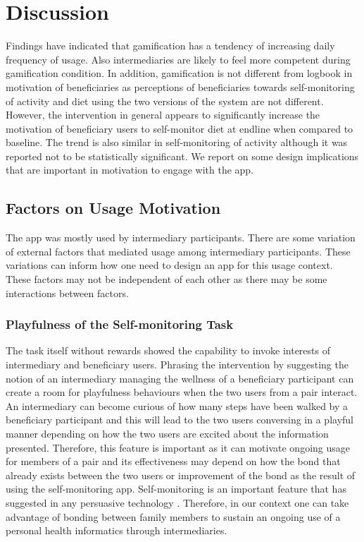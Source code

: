 \documentclass{sig-alternate}
\begin{document}
\section{Discussion}
Findings have indicated that gamification has a tendency of increasing daily frequency of usage. Also intermediaries are likely to feel more competent during gamification condition. In addition, gamification is not different from logbook in motivation of beneficiaries as perceptions of beneficiaries towards self-monitoring of activity and diet using the two versions of the system are not different. However, the intervention in general appears to significantly increase the motivation of beneficiary users to self-monitor diet at endline when compared to baseline. The trend is also similar in self-monitoring of activity although it was reported not to be statistically significant. We report on some design implications that are important in motivation to engage with the app.
\subsection{Factors on Usage Motivation}
The app was mostly used by intermediary participants. There are some variation of external factors that mediated usage among intermediary participants. These variations can inform how one need to design an app for this usage context. These factors may not be independent of each other as there may be some interactions between factors.
\subsubsection*{\textbf{Playfulness  of the Self-monitoring Task}} 
The task itself without rewards showed the capability to invoke interests of intermediary and beneficiary users. Phrasing the intervention by suggesting the notion of an intermediary managing the wellness of a beneficiary participant can create a room for playfulness behaviours when the two users from a pair interact. An intermediary can become curious of how many steps have been walked by a beneficiary participant and this will lead to the two users conversing in a playful manner depending on how the two users are excited about the information presented. Therefore, this feature is important as it can motivate ongoing usage for members of a pair and its effectiveness may depend on how the bond that already exists between the two users or improvement of the bond as the result of using the self-monitoring app. Self-monitoring is an important feature that has suggested in any persuasive technology \cite{Oinas-kukkonen:psd}. Therefore, in our context one can take advantage of bonding between family members to sustain an ongoing use of a personal health informatics through intermediaries.  
\end{document}
